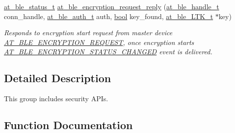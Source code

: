 \begin{DoxyCompactItemize}
\mbox{\hyperlink{group__error__codes__group_ga3b1db9b95feb157b3c188ca27fe76988}{at\+\_\+ble\+\_\+status\+\_\+t}} \mbox{\hyperlink{group__gap__sec__group_ga193b7ad378a2005d515dc92c40cfc14a}{at\+\_\+ble\+\_\+encryption\+\_\+request\+\_\+reply}} (\mbox{\hyperlink{at__ble__api_8h_abd23646d0c662860741f787efc8456f2}{at\+\_\+ble\+\_\+handle\+\_\+t}} conn\+\_\+handle, \mbox{\hyperlink{at__ble__api_8h_a70253ec09a2361d16e15c37f8cb5b97c}{at\+\_\+ble\+\_\+auth\+\_\+t}} auth, \mbox{\hyperlink{group__group__sam0__utils_ga97a80ca1602ebf2303258971a2c938e2}{bool}} key\+\_\+found, \mbox{\hyperlink{structat__ble___l_t_k__t}{at\+\_\+ble\+\_\+\+L\+T\+K\+\_\+t}} $\ast$key)
\begin{DoxyCompactList}\small\item\em Responds to encryption start request from master device \mbox{\hyperlink{at__ble__api_8h_a3324640b95f33169515f89738ed5baebade3647c9d18213cb3e93f570c09f20c6}{A\+T\+\_\+\+B\+L\+E\+\_\+\+E\+N\+C\+R\+Y\+P\+T\+I\+O\+N\+\_\+\+R\+E\+Q\+U\+E\+ST}}, once encryption starts \mbox{\hyperlink{at__ble__api_8h_a3324640b95f33169515f89738ed5baebaac5cdd3deee1c0cb4672efbfb9ebae75}{A\+T\+\_\+\+B\+L\+E\+\_\+\+E\+N\+C\+R\+Y\+P\+T\+I\+O\+N\+\_\+\+S\+T\+A\+T\+U\+S\+\_\+\+C\+H\+A\+N\+G\+ED}} event is delivered. \end{DoxyCompactList}\end{DoxyCompactItemize}


\subsection{Detailed Description}
This group includes security A\+P\+Is. 



\subsection{Function Documentation}
\mbox{\label{group__gap__sec__group_ga937a2436bd501a104500420f4cf82d28}} 
